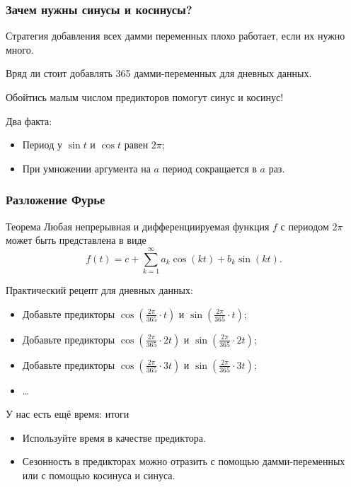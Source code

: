 \begin{frame}
  \frametitle{Зачем нужны синусы и косинусы?}

  Стратегия добавления всех дамми переменных \alert{плохо} работает, если их нужно \alert{много}. \pause 
  
  Вряд ли стоит добавлять 365 дамми-переменных для \alert{дневных} данных. \pause

  Обойтись \alert{малым числом} предикторов помогут синус и косинус!

  \pause 
  Два факта:
  \begin{itemize}[<+->]
    \item Период у $\sin t$ и $\cos t$ равен $2\pi$;
    \item При умножении аргумента на $a$ период \alert{сокращается} в $a$ раз.
  \end{itemize}

\end{frame}


\begin{frame}
  \frametitle{Разложение Фурье}

  \begin{block}{Теорема}
    Любая непрерывная и дифференциируемая функция $f$ с периодом $2\pi$ может быть представлена в виде 
        \[
        f(t) = c + \sum_{k=1}^{\infty} a_k \cos(kt) + b_k \sin (kt).   
        \]
  \end{block}

  \pause 
  Практический рецепт для дневных данных:
  \begin{itemize}[<+->]
    \item Добавьте предикторы $\cos\left(\frac{2\pi}{365} \cdot t\right)$ и $\sin\left(\frac{2\pi}{365}  \cdot t\right)$;
    \item Добавьте предикторы $\cos\left(\frac{2\pi}{365}  \cdot 2t\right)$ и $\sin\left(\frac{2\pi}{365} \cdot  2t\right)$;
    \item Добавьте предикторы $\cos\left(\frac{2\pi}{365}  \cdot 3t\right)$ и $\sin\left(\frac{2\pi}{365}  \cdot 3t\right)$;
    \item \ldots 
  \end{itemize}


  

\end{frame}

\begin{frame}{У нас есть ещё время: итоги}

  \begin{itemize}[<+->]
    \item Используйте \alert{время} в качестве предиктора.
    \item Сезонность в предикторах можно отразить с помощью \alert{дамми-переменных} или 
    с помощью \alert{косинуса} и \alert{синуса}.
  \end{itemize}
\end{frame}



